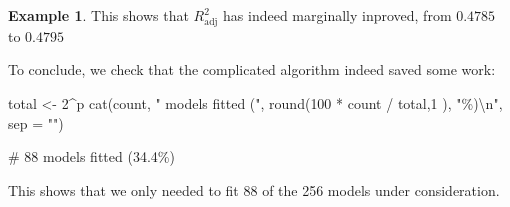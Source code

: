 \documentclass[
  a4paper,
]{article}
\newenvironment{Shaded}{\begin{snugshade}}{\end{snugshade}}
\newcommand{\AttributeTok}[1]{\textcolor[rgb]{0.77,0.63,0.00}{#1}}
\newcommand{\DecValTok}[1]{\textcolor[rgb]{0.00,0.00,0.81}{#1}}
\newcommand{\FunctionTok}[1]{\textcolor[rgb]{0.00,0.00,0.00}{#1}}
\newcommand{\NormalTok}[1]{#1}
\newcommand{\OtherTok}[1]{\textcolor[rgb]{0.56,0.35,0.01}{#1}}
\newcommand{\SpecialCharTok}[1]{\textcolor[rgb]{0.00,0.00,0.00}{#1}}
\newcommand{\StringTok}[1]{\textcolor[rgb]{0.31,0.60,0.02}{#1}}
\theoremstyle{definition}
\theoremstyle{definition}
\newtheorem{example}{Example}[section]
\theoremstyle{definition}
\theoremstyle{definition}
\theoremstyle{remark}
\begin{document}
\begin{example}
This shows that \(R^2_\mathrm{adj}\) has indeed marginally inproved,
from \(0.4785\) to \(0.4795\)

To conclude, we check that the complicated algorithm indeed saved some work:

\begin{Shaded}
\begin{Highlighting}[]
\NormalTok{total }\OtherTok{\textless{}{-}} \DecValTok{2}\SpecialCharTok{\^{}}\NormalTok{p}
\FunctionTok{cat}\NormalTok{(count,}
    \StringTok{" models fitted ("}\NormalTok{, }\FunctionTok{round}\NormalTok{(}\DecValTok{100} \SpecialCharTok{*}\NormalTok{ count }\SpecialCharTok{/}\NormalTok{ total,}\DecValTok{1}\NormalTok{ ), }\StringTok{"\%)}\SpecialCharTok{\textbackslash{}n}\StringTok{"}\NormalTok{,}
    \AttributeTok{sep =} \StringTok{""}\NormalTok{)}
\end{Highlighting}
\end{Shaded}

\begin{Shaded}
\begin{Highlighting}[]
\NormalTok{\# 88 models fitted (34.4\%)}
\end{Highlighting}
\end{Shaded}

This shows that we only needed to fit 88 of the 256 models under consideration.
\end{example}
\end{document}
